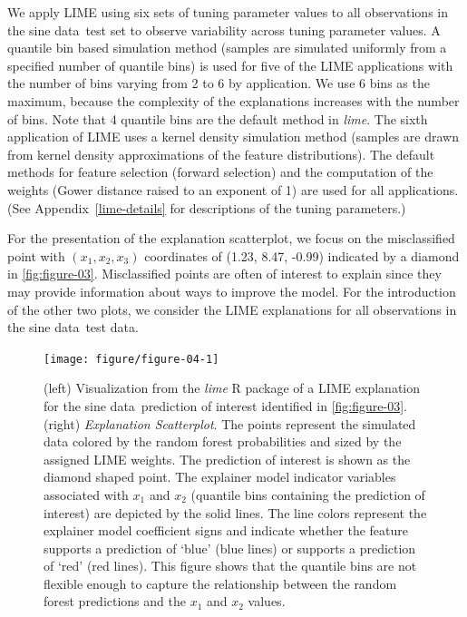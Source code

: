 \documentclass[AMS,STIX2COL]{WileyNJD-v2}\usepackage[]{graphicx}\usepackage[]{color}
\newenvironment{knitrout}{}{} %
\newcommand{\data}{sine data}
\begin{document}
We apply LIME using six sets of tuning parameter values to all observations in the \data \ test set to observe variability across tuning parameter values. A quantile bin based simulation method (samples are simulated uniformly from a specified number of quantile bins) is used for five of the LIME applications with the number of bins varying from 2 to 6 by application. We use 6 bins as the maximum, because the complexity of the explanations increases with the number of bins. Note that 4 quantile bins are the default method in \emph{lime}. The sixth application of LIME uses a kernel density simulation method (samples are drawn from kernel density approximations of the feature distributions). The default methods for feature selection (forward selection) and the computation of the weights (Gower distance raised to an exponent of 1) are used for all applications. (See Appendix~\ref{lime-details} for descriptions of the tuning parameters.)

For the presentation of the explanation scatterplot, we focus on the misclassified point with $(x_1, x_2, x_3)$ coordinates of (1.23, 8.47, -0.99) indicated by a diamond in \autoref{fig:figure-03}. Misclassified points are often of interest to explain since they may provide information about ways to improve the model. For the introduction of the other two  plots, we consider the LIME explanations for  all observations in the \data \ test data.





\begin{figure}[!thp]
\begin{knitrout}
\color{fgcolor}

{\centering \texttt{[image: figure/figure-04-1]} 

}



\end{knitrout}
\caption{(left) Visualization from the \emph{lime} R package of a LIME explanation for the \data \ prediction of interest identified in \autoref{fig:figure-03}. (right) \emph{Explanation Scatterplot}. The points represent the simulated data colored by the random forest probabilities and sized by the assigned LIME weights. The prediction of interest is shown as the diamond shaped point. The explainer model indicator variables associated with $x_1$ and $x_2$ (quantile bins containing the prediction of interest) are depicted by the solid lines. The line colors represent the explainer model coefficient signs and indicate whether the feature supports a prediction of `blue' (blue lines) or supports a prediction of `red' (red lines). This figure shows that the quantile bins are not flexible enough to capture the relationship between the random forest predictions and the $x_1$ and $x_2$ values.}
\label{fig:figure-04}
\end{figure}
\end{document}
